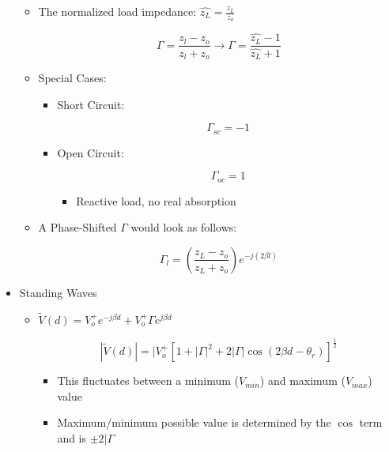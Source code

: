 \begin{itemize}
\begin{itemize}
    \item The normalized load impedance: $\hat{z_L}=\frac{z_L}{z_o}$

      $$\Gamma=\frac{z_l-z_o}{z_l+z_o}\rightarrow\Gamma = \frac{\hat{z_L}-1}{\hat{z_L}+1}$$

    \item Special Cases:

      \begin{itemize}

        \item Short Circuit:

          $$\Gamma_{sc}=-1$$

        \item Open Circuit:

          $$\Gamma_{oc}=1$$

          \begin{itemize}

            \item Reactive load, no real absorption

          \end{itemize}

      \end{itemize}

    \item A Phase-Shifted $\Gamma$ would look as follows:

      $$\Gamma_l=\left(\frac{z_L-z_o}{z_L+z_o}\right)e^{-j(2\beta l)}$$

    \end{itemize}

  \item Standing Waves

    \begin{itemize}

      \item $\tilde{V}(d)=V_o^+e^{-j\beta d}+V_o^+\Gamma e^{j\beta d}$

        $$|\tilde{V}(d)|=|V_o^+\left[ 1+|\Gamma|^2 + 2|\Gamma|\cos(2\beta d-\theta_r) \right]^{\frac{1}{2}}$$

        \begin{itemize}

          \item This fluctuates between a minimum ($V_{min}$) and maximum ($V_{max}$) value

          \item Maximum/minimum possible value is determined by the $\cos$ term and is $\pm2|\Gamma$ 


\end{itemize}
\end{itemize}
\end{itemize}
